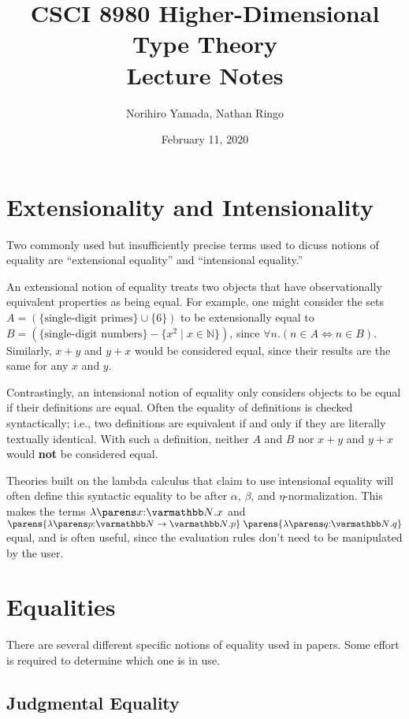 \documentclass[11pt]{article}
\title{CSCI 8980 Higher-Dimensional Type Theory\\ Lecture Notes}
\author{Norihiro Yamada, Nathan Ringo}
\date{February 11, 2020}
\begin{document}
\maketitle

\section{Extensionality and Intensionality}
Two commonly used but insufficiently precise terms used to dicuss notions of equality are ``extensional equality'' and ``intensional equality.''

An extensional notion of equality treats two objects that have observationally equivalent properties as being equal. For example, one might consider the sets $A = \left(\{\textrm{single-digit primes}\} \cup \{6\}\right)$ to be extensionally equal to $B = \left(\{\textrm{single-digit numbers}\} - \{x^2 \mid x \in \mathbb{N}\}\right)$, since $\forall n. \left(n \in A \iff n \in B\right)$. Similarly, $x + y$ and $y + x$ would be considered equal, since their results are the same for any $x$ and $y$.

Contrastingly, an intensional notion of equality only considers objects to be equal if their definitions are equal. Often the equality of definitions is checked syntactically; i.e., two definitions are equivalent if and only if they are literally textually identical. With such a definition, neither $A$ and $B$ nor $x + y$ and $y + x$ would \textbf{not} be considered equal.

Theories built on the lambda calculus that claim to use intensional equality will often define this syntactic equality to be after $\alpha$, $\beta$, and $\eta$-normalization. This makes the terms $\lam{x}[\nattype]{x}$ and $\app{\parens{\lam{p}[\funtype{\nattype}{\nattype}]{p}}}{\parens{\lam{q}[\nattype]{q}}}$ equal, and is often useful, since the evaluation rules don't need to be manipulated by the user.

\section{Equalities}

There are several different specific notions of equality used in papers. Some effort is required to determine which one is in use.

\subsection{Judgmental Equality}
\end{document}
